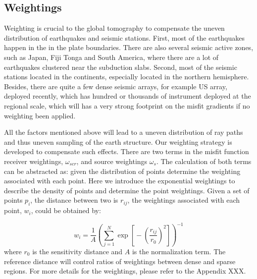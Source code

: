 \documentclass[extra,mreferee]{gji}
\begin{document}
\subsection{Weightings}
Weighting is crucial to the global tomography to compensate the uneven distribution
of earthquakes and seismic stations. First, most of the earthquakes happen in the
in the plate boundaries. There are also several seismic active zones, such as Japan,
Fiji Tonga and South America, where there are a lot of earthquakes clustered near
the subduction slabs.
Second, most of the seismic stations located in the continents, especially located in
the northern hemisphere. Besides, there are quite a few dense seismic arrays,
for example US array, deployed recently, which has hundred or thousands of instrument deployed
at the regional scale, which will has a very strong footprint on the misfit gradients if no weighting
been applied.

All the factors mentioned above will lead to a uneven distribution of
ray paths and thus uneven sampling of the earth structure. Our weighting strategy
is developed to compensate such effects. There are two terms in the misfit function
receiver weightings, $\omega_{scr}$, and source weightings $\omega_{s}$.
The calculation of both terms can be abstracted as: given the distribution of
points determine the weighting associated with each point.
Here we introduce the exponential weightings to describe the density of points and
determine the point weightings. Given a set of points $p_i$, the distance between
two is $r_{ij}$, the weightings associated with each point, $w_i$, could be obtained by:

\begin{equation}
w_{i} = \frac{1}{A} \left(
  \sum_{j=1}^N \exp \left[ \mbox{} - \left( \frac{r_{ij}} {r_{0}} \right)^2 \right] \right) ^{-1}
\label{eq:spatial_weights}
\end{equation}
where $r_{0}$ is the sensitivity distance and $A$ is the normalization term.
The reference distance will control ratios of weightings between dense and
sparse regions. For more details for the weightings, please refer to the Appendix XXX.
\end{document}
